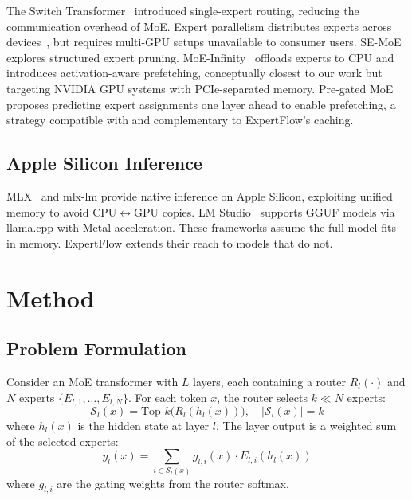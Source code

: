 \documentclass[11pt,a4paper]{article}
\begin{document}
The Switch Transformer~\citep{fedus2022switch} introduced single-expert
routing, reducing the communication overhead of MoE. Expert parallelism
distributes experts across devices~\citep{lepikhin2021gshard,
rajbhandari2022deepspeedmoe}, but requires multi-GPU setups unavailable to
consumer users. SE-MoE~\citep{hwang2023semoe} explores structured expert
pruning. MoE-Infinity~\citep{xue2024moeinf} offloads experts to CPU and
introduces activation-aware prefetching, conceptually closest to our work but
targeting NVIDIA GPU systems with PCIe-separated memory.
Pre-gated MoE~\citep{hwang2024pregated} proposes predicting expert assignments
one layer ahead to enable prefetching, a strategy compatible with and
complementary to ExpertFlow's caching.

\subsection{Apple Silicon Inference}
\label{sec:related:apple}

MLX~\citep{mlx2023} and mlx-lm provide native inference on Apple Silicon,
exploiting unified memory to avoid CPU$\leftrightarrow$GPU copies. LM
Studio~\citep{lmstudio} supports GGUF models via llama.cpp with Metal
acceleration. These frameworks assume the full model fits in memory.
ExpertFlow extends their reach to models that do not.

\section{Method}
\label{sec:method}

\subsection{Problem Formulation}
\label{sec:method:problem}

Consider an MoE transformer with $L$ layers, each containing a router
$R_l(\cdot)$ and $N$ experts $\{E_{l,1}, \ldots, E_{l,N}\}$. For each token
$x$, the router selects $k \ll N$ experts:
\begin{equation}
  \mathcal{S}_l(x) = \text{Top-}k\bigl(R_l(h_l(x))\bigr), \quad
  |\mathcal{S}_l(x)| = k
\end{equation}
where $h_l(x)$ is the hidden state at layer $l$. The layer output is a
weighted sum of the selected experts:
\begin{equation}
  y_l(x) = \sum_{i \in \mathcal{S}_l(x)} g_{l,i}(x) \cdot E_{l,i}(h_l(x))
\end{equation}
where $g_{l,i}$ are the gating weights from the router softmax.
\end{document}
